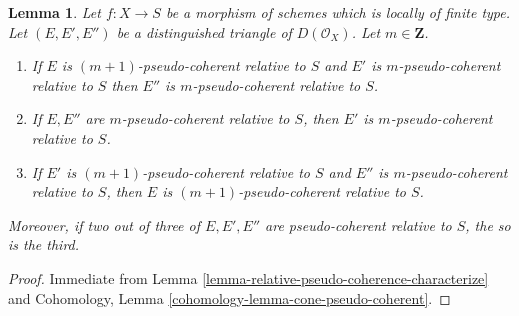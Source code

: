 \documentclass[10pt,a4paper]{amsart}
\theoremstyle{plain}
\newtheorem{lemma}[subsection]{Lemma}
\theoremstyle{definition}
\theoremstyle{remark}
\numberwithin{equation}{subsection}
\begin{document}
\begin{lemma}
\label{lemma-cone-relatively-pseudo-coherent}
Let $f : X \to S$ be a morphism of schemes which is locally of finite type.
Let $(E, E', E'')$ be a distinguished triangle of
$D(\mathcal{O}_X)$. Let $m \in \mathbf{Z}$.
\begin{enumerate}
\item If $E$ is $(m + 1)$-pseudo-coherent relative to $S$ and
$E'$ is $m$-pseudo-coherent relative to $S$ then $E''$ is
$m$-pseudo-coherent relative to $S$.
\item If $E, E''$ are $m$-pseudo-coherent relative to $S$,
then $E'$ is $m$-pseudo-coherent relative to $S$.
\item If $E'$ is $(m + 1)$-pseudo-coherent relative to $S$
and $E''$ is $m$-pseudo-coherent relative to $S$, then
$E$ is $(m + 1)$-pseudo-coherent relative to $S$.
\end{enumerate}
Moreover, if two out of three of $E, E', E''$ are pseudo-coherent
relative to $S$, the so is the third.
\end{lemma}

\begin{proof}
Immediate from Lemma \ref{lemma-relative-pseudo-coherence-characterize} and
Cohomology, Lemma \ref{cohomology-lemma-cone-pseudo-coherent}.
\end{proof}
\end{document}
